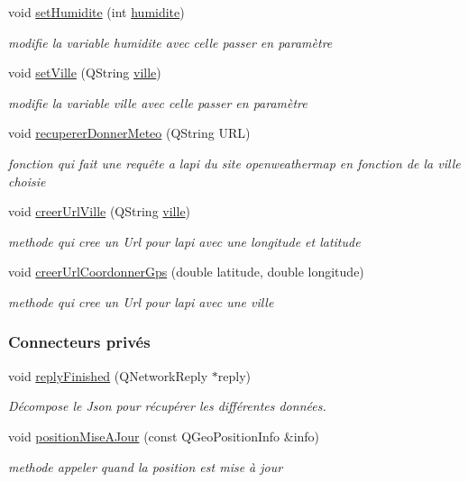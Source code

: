 \begin{DoxyCompactItemize}
void \hyperlink{class_meteo_adb383986b49742d49f3fe86ca7bec358}{set\+Humidite} (int \hyperlink{class_meteo_ada819b35e83127ce17a51abad383f349}{humidite})
\begin{DoxyCompactList}\small\item\em modifie la variable humidite avec celle passer en paramètre \end{DoxyCompactList}\item 
void \hyperlink{class_meteo_ae6f56d33b87f62db4d6ebd88226d9e5f}{set\+Ville} (Q\+String \hyperlink{class_meteo_a20ab84130cd8c6085e665f1d7d8403a6}{ville})
\begin{DoxyCompactList}\small\item\em modifie la variable ville avec celle passer en paramètre \end{DoxyCompactList}\item 
void \hyperlink{class_meteo_abb613fded967168801097cf487ac2e29}{recuperer\+Donner\+Meteo} (Q\+String U\+RL)
\begin{DoxyCompactList}\small\item\em fonction qui fait une requête a l\textquotesingle{}api du site openweathermap en fonction de la ville choisie \end{DoxyCompactList}\item 
void \hyperlink{class_meteo_a256a2559d391cb862009c778a97dee2c}{creer\+Url\+Ville} (Q\+String \hyperlink{class_meteo_a20ab84130cd8c6085e665f1d7d8403a6}{ville})
\begin{DoxyCompactList}\small\item\em methode qui cree un Url pour l\textquotesingle{}api avec une longitude et latitude \end{DoxyCompactList}\item 
void \hyperlink{class_meteo_a1580d310479be44d2c94a2967d53e043}{creer\+Url\+Coordonner\+Gps} (double latitude, double longitude)
\begin{DoxyCompactList}\small\item\em methode qui cree un Url pour l\textquotesingle{}api avec une ville \end{DoxyCompactList}\end{DoxyCompactItemize}
\subsubsection*{Connecteurs privés}
\begin{DoxyCompactItemize}
\item 
void \hyperlink{class_meteo_a3bb764a7af2d35df9018e0acb3a88127}{reply\+Finished} (Q\+Network\+Reply $\ast$reply)
\begin{DoxyCompactList}\small\item\em Décompose le Json pour récupérer les différentes données. \end{DoxyCompactList}\item 
void \hyperlink{class_meteo_af6fbf43af30cfd3987f058d1ab7ab27b}{position\+Mise\+A\+Jour} (const Q\+Geo\+Position\+Info \&info)
\begin{DoxyCompactList}\small\item\em methode appeler quand la position est mise à jour \end{DoxyCompactList}\end{DoxyCompactItemize}
